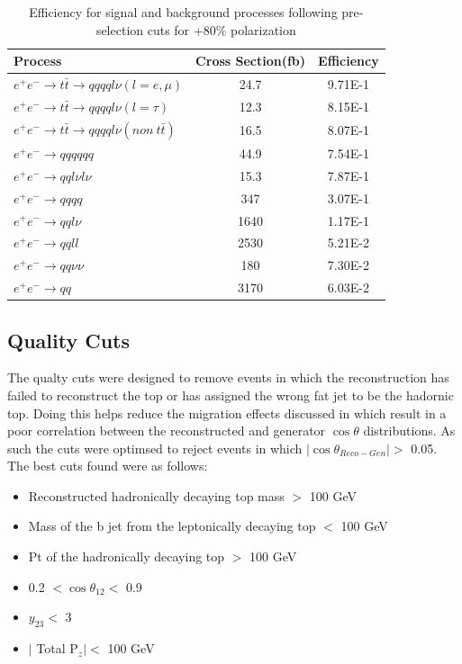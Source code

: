 \begin{table}
  \centering
  \begin{tabular}{l | c | c }
    \toprule
    Process     & Cross Section(fb) & Efficiency \\
    \midrule
     $e^+e^-\rightarrow t\bar{t} \rightarrow qqqql\nu (l=e,\mu)$& 24.7 & 9.71E-1\\
    \midrule
    $e^+e^-\rightarrow t\bar{t} \rightarrow qqqql\nu (l=\tau)$& 12.3 & 8.15E-1\\
    \midrule
    $e^+e^-\rightarrow t\bar{t} \rightarrow qqqql\nu (non ~ t\bar{t})$& 16.5 & 8.07E-1\\
    \midrule
    $e^+e^-\rightarrow qqqqqq$ & 44.9 &  7.54E-1\\
    \midrule
    $e^+e^-\rightarrow qql\nu l\nu$ & 15.3  & 7.87E-1\\
    \midrule
    $e^+e^-\rightarrow qqqq$ & 347 &  3.07E-1\\
    \midrule
    $e^+e^-\rightarrow qql\nu$ & 1640 &  1.17E-1\\
    \midrule
    $e^+e^-\rightarrow qqll$ & 2530 &  5.21E-2\\
    \midrule
    $e^+e^-\rightarrow qq\nu\nu$ & 180 & 7.30E-2 \\
    \midrule
    $e^+e^-\rightarrow qq$ & 3170 & 6.03E-2 \\
    \bottomrule
  \end{tabular}
  \caption{Efficiency for signal and background processes following pre-selection cuts for +80\% polarization}
  \label{table:toppreselpos}
\end{table}

\subsection{Quality Cuts}
\label{Quality Cuts}

The qualty cuts were designed to remove events in which the reconstruction has failed to reconstruct the top or has assigned the wrong fat jet to be the hadornic top. Doing this helps reduce the migration effects discussed in  which result in a poor correlation between the reconstructed and generator $\cos\theta$ distributions. As such the cuts were optimsed to reject events in which $|\cos\theta_{Reco-Gen}| > $ 0.05. The best cuts found were as follows:

\begin{itemize}
\item Reconstructed hadronically decaying top mass $>$ 100 GeV
\item Mass of the b jet from the leptonically decaying top $<$ 100 GeV
\item Pt of the hadronically decaying top $>$ 100 GeV
\item 0.2 $< \cos\theta_{12} <$ 0.9
\item $y_{23} <$ 3
\item $\mid$ Total P$_z \mid <$ 100 GeV
\end{itemize}

